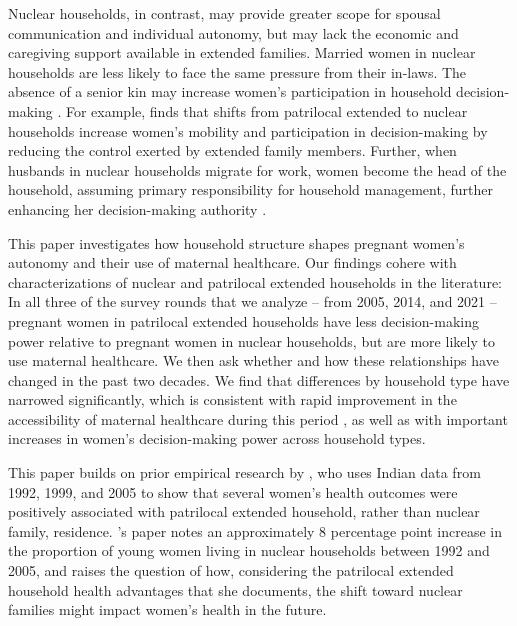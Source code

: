 \documentclass[10pt,twoside,reqno]{article}
\begin{document}
Nuclear households, in contrast, may provide greater scope for spousal communication and individual autonomy, but may lack the economic and caregiving support available in extended families. Married women in nuclear households are less likely to face the same pressure from their in-laws. The absence of a senior kin may increase women’s participation in household decision-making \citep{simkhada2010role,char2010influence}. For example, \cite{mookerjee2019gender} finds that shifts from patrilocal extended to nuclear households increase women’s mobility and participation in decision-making by reducing the control exerted by extended family members. Further, when husbands in nuclear households migrate for work, women become the head of the household, assuming primary responsibility for  household management, further enhancing her decision-making authority \citep{desai2008negotiated}. 

This paper investigates how household structure shapes pregnant women's autonomy and their use of maternal healthcare.  Our findings cohere with characterizations of nuclear and patrilocal extended households in the literature: In all three of the survey rounds that we analyze -- from 2005, 2014, and 2021 -- pregnant women in patrilocal extended households have less decision-making power relative to pregnant women in nuclear households, but are more likely to use maternal healthcare.  We then ask whether and how these relationships have changed in the past two decades.  We find that differences by household type have narrowed significantly, which is consistent with rapid improvement in the accessibility of maternal healthcare during this period \citep{gandhi2022predictors, rai2022use}, as well as with important increases in women's decision-making power across household types.

This paper builds on prior empirical research by \cite{allendorf2013going}, who uses Indian data from 1992, 1999, and 2005 to show that several women's health outcomes were positively associated with patrilocal extended household, rather than nuclear family, residence.  \cite{allendorf2013going}'s paper notes an approximately 8 percentage point increase in the proportion of young women living in nuclear households between 1992 and 2005, and raises the question of how, considering the patrilocal extended household health advantages that she documents, the shift toward nuclear families might impact women's health in the future.  
\end{document}

